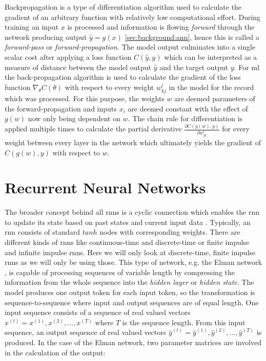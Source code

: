 Backpropagation is a type of differentiation algorithm used to calculate the gradient of an arbitrary function with relatively low computational effort. 
During training an input $x$ is processed and information is flowing \textit{forward} through the network producing output $\hat{y} = g(x)$ \ref{sec:background:ann}, hence this is called a \textit{forward-pass} or \textit{forward-propagation}. The model output culminates into a single scalar cost after applying a loss function $C(\hat{y}, y)$ which can be interpreted as a measure of distance between the model output $\hat{y}$ and the target output $y$. For \gls{ml} the back-propagation algorithm is used to calculate the gradient of the loss function $\nabla_\theta C(\theta)$ with respect to every weight $w^l_{kj}$ in the model for the record which was processed. For this purpose, the weights $w$ are deemed parameters of the forward-propagation and inputs $x_i$ are deemed constant with the effect of $g(w)$ now only being dependent on $w$. The chain rule for differentiation is applied multiple times to calculate the partial derivative $\frac{\partial C(g(w),y)}{\partial w^l_{jk}}$ for every weight between every layer in the network which ultimately yields the gradient of $C(g(w),y)$ with respect to $w$.

\section{Recurrent Neural Networks} \label{sec:background:rnn}

The broader concept behind all \glspl{rnn} is a cyclic connection which enables the \gls{rnn} to update its state based on past states and current input data \cite{rnn_review}. Typically, an \gls{rnn} consists of standard $tanh$ nodes with corresponding weights. There are different kinds of \glspl{rnn} like continuous-time and discrete-time or finite impulse and infinite impulse \glspl{rnn}. Here we will only look at discrete-time, finite impulse \glspl{rnn} as we will only be using those. This type of network, e.g. the Elman network \cite{rnn_elman}, is capable of processing sequences of variable length by compressing the information from the whole sequence into the \textit{hidden layer} or \textit{hidden state}. The model produces one output token for each input token, so the transformation is sequence-to-sequence where input and output sequences are of equal length. One input sequence consists of a sequence of real valued vectors $x^{(t)} = x^{(1)}, x^{(2)}, ... , x^{(T)}$ where $T$ is the sequence length. From this input sequence, an output sequence of real valued vectors $\hat{y}^{(t)} = \hat{y}^{(1)}, \hat{y}^{(2)}, ... , \hat{y}^{(T)}$ is produced. In the case of the Elman network, two parameter matrices are involved in the calculation of the output:

